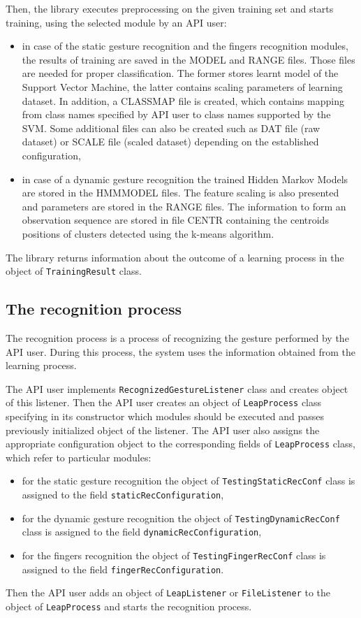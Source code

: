 Then, the library executes preprocessing on the given training set and starts training, using the selected module by an API user:
\begin{itemize}
\item in case of the static gesture recognition and the fingers recognition modules, the results of training are saved in the MODEL and RANGE files. Those files are needed for proper classification. The former stores learnt model of the Support Vector Machine, the latter contains scaling parameters of learning dataset. In addition, a CLASSMAP file is created, which contains mapping from class names specified by API user to class names supported by the SVM. Some additional files can also be created such as DAT file (raw dataset) or SCALE file (scaled dataset) depending on the established configuration,
\item in case of a dynamic gesture recognition the trained Hidden Markov Models are stored in the HMMMODEL files. The feature scaling is also presented and parameters are stored in the RANGE files. The information to form an observation sequence are stored in file CENTR containing the centroids positions of clusters detected using the k-means algorithm. 
\end{itemize}

The library returns information about the outcome of a learning process in the object of \linebreak \texttt{TrainingResult} class.


\subsection{The recognition process}
The recognition process is a process of recognizing the gesture performed by the API user. During this process, the system uses the information obtained from the learning process. 

The API user implements \texttt{RecognizedGestureListener} class and creates object of this listener. Then the API user creates an object of \texttt{LeapProcess} class specifying in its constructor which modules should be executed and passes previously initialized object of the listener. The API user also assigns the appropriate configuration object to the corresponding fields of \texttt{LeapProcess} class, which refer to particular modules:
\begin{itemize}
\item for the static gesture recognition the object of \texttt{TestingStaticRecConf} class is assigned to the field \texttt{staticRecConfiguration},
\item for the dynamic gesture recognition the object of \texttt{TestingDynamicRecConf} class is assigned to the field \texttt{dynamicRecConfiguration},
\item for the fingers recognition the object of \texttt{TestingFingerRecConf} class is assigned to the field \texttt{fingerRecConfiguration}.
\end{itemize}
Then the API user adds an object of \texttt{LeapListener} or \texttt{FileListener} to the object of \texttt{LeapProcess} and starts the recognition process.


